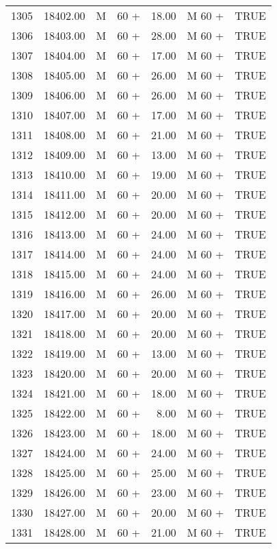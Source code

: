 \begin{table}[ht]
\begin{tabular}{rrllrll}
  1305 & 18402.00 & M & 60 + & 18.00 & M 60 + & TRUE \\ 
  1306 & 18403.00 & M & 60 + & 28.00 & M 60 + & TRUE \\ 
  1307 & 18404.00 & M & 60 + & 17.00 & M 60 + & TRUE \\ 
  1308 & 18405.00 & M & 60 + & 26.00 & M 60 + & TRUE \\ 
  1309 & 18406.00 & M & 60 + & 26.00 & M 60 + & TRUE \\ 
  1310 & 18407.00 & M & 60 + & 17.00 & M 60 + & TRUE \\ 
  1311 & 18408.00 & M & 60 + & 21.00 & M 60 + & TRUE \\ 
  1312 & 18409.00 & M & 60 + & 13.00 & M 60 + & TRUE \\ 
  1313 & 18410.00 & M & 60 + & 19.00 & M 60 + & TRUE \\ 
  1314 & 18411.00 & M & 60 + & 20.00 & M 60 + & TRUE \\ 
  1315 & 18412.00 & M & 60 + & 20.00 & M 60 + & TRUE \\ 
  1316 & 18413.00 & M & 60 + & 24.00 & M 60 + & TRUE \\ 
  1317 & 18414.00 & M & 60 + & 24.00 & M 60 + & TRUE \\ 
  1318 & 18415.00 & M & 60 + & 24.00 & M 60 + & TRUE \\ 
  1319 & 18416.00 & M & 60 + & 26.00 & M 60 + & TRUE \\ 
  1320 & 18417.00 & M & 60 + & 20.00 & M 60 + & TRUE \\ 
  1321 & 18418.00 & M & 60 + & 20.00 & M 60 + & TRUE \\ 
  1322 & 18419.00 & M & 60 + & 13.00 & M 60 + & TRUE \\ 
  1323 & 18420.00 & M & 60 + & 20.00 & M 60 + & TRUE \\ 
  1324 & 18421.00 & M & 60 + & 18.00 & M 60 + & TRUE \\ 
  1325 & 18422.00 & M & 60 + & 8.00 & M 60 + & TRUE \\ 
  1326 & 18423.00 & M & 60 + & 18.00 & M 60 + & TRUE \\ 
  1327 & 18424.00 & M & 60 + & 24.00 & M 60 + & TRUE \\ 
  1328 & 18425.00 & M & 60 + & 25.00 & M 60 + & TRUE \\ 
  1329 & 18426.00 & M & 60 + & 23.00 & M 60 + & TRUE \\ 
  1330 & 18427.00 & M & 60 + & 20.00 & M 60 + & TRUE \\ 
  1331 & 18428.00 & M & 60 + & 21.00 & M 60 + & TRUE \\ 

\end{tabular}
\end{table}
